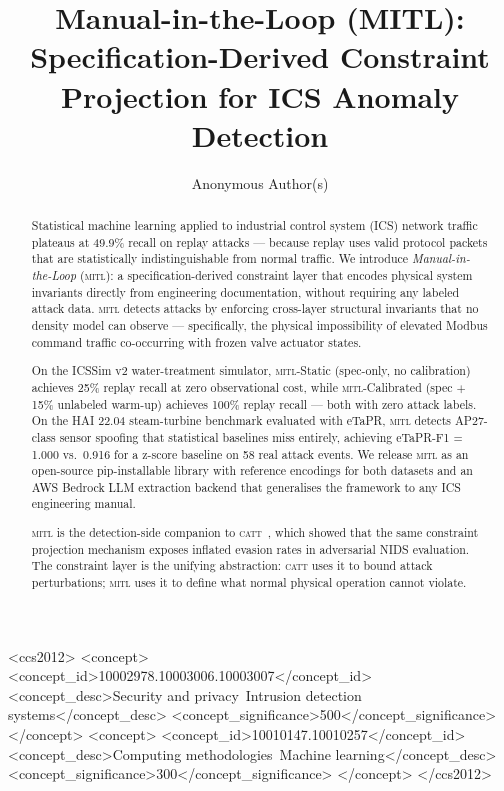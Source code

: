 \documentclass[sigconf,anonymous,review]{acmart}
\newcommand{\mitl}{\textsc{mitl}\xspace}
\newcommand{\catt}{\textsc{catt}\xspace}
\begin{document}
\title{Manual-in-the-Loop (MITL): Specification-Derived Constraint Projection
       for ICS Anomaly Detection}

\author{Anonymous Author(s)}

\begin{abstract}
Statistical machine learning applied to industrial control system (ICS) network
traffic plateaus at 49.9\% recall on replay attacks — because replay uses
valid protocol packets that are statistically indistinguishable from normal
traffic.  We introduce \emph{Manual-in-the-Loop} (\mitl): a
specification-derived constraint layer that encodes physical system invariants
directly from engineering documentation, without requiring any labeled attack
data.  \mitl detects attacks by enforcing cross-layer structural invariants
that no density model can observe — specifically, the physical impossibility of
elevated Modbus command traffic co-occurring with frozen valve actuator states.

On the ICSSim v2 water-treatment simulator, \mitl-Static (spec-only, no
calibration) achieves 25\% replay recall at zero observational cost, while
\mitl-Calibrated (spec $+$ 15\% unlabeled warm-up) achieves 100\% replay
recall — both with zero attack labels.  On the HAI 22.04 steam-turbine
benchmark evaluated with eTaPR, \mitl detects AP27-class sensor spoofing that
statistical baselines miss entirely, achieving eTaPR-F1 = 1.000 vs.\ 0.916 for a z-score baseline on 58 real attack events.
We release \mitl as an open-source pip-installable library with reference
encodings for both datasets and an AWS Bedrock LLM extraction backend that
generalises the framework to any ICS engineering manual.

\mitl is the detection-side companion to \catt~\cite{catt2026}, which showed
that the same constraint projection mechanism exposes inflated evasion rates
in adversarial NIDS evaluation.  The constraint layer is the unifying
abstraction: \catt uses it to bound attack perturbations; \mitl uses it to
define what normal physical operation cannot violate.
\end{abstract}

\begin{CCSXML}
<ccs2012>
  <concept>
    <concept_id>10002978.10003006.10003007</concept_id>
    <concept_desc>Security and privacy~Intrusion detection systems</concept_desc>
    <concept_significance>500</concept_significance>
  </concept>
  <concept>
    <concept_id>10010147.10010257</concept_id>
    <concept_desc>Computing methodologies~Machine learning</concept_desc>
    <concept_significance>300</concept_significance>
  </concept>
</ccs2012>
\end{CCSXML}
\end{document}
